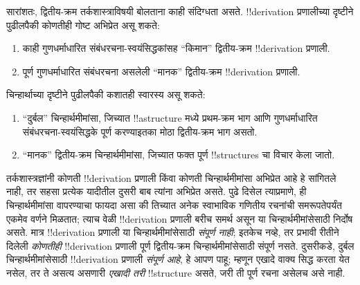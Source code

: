 \documentclass[../../../include/open-logic-section]{subfiles}
\begin{document}
सारांशतः, द्वितीय-क्रम तर्कशास्त्राविषयी बोलताना काही संदिग्धता असते.
!!{derivation} प्रणालीच्या दृष्टीने पुढीलपैकी कोणतीही गोष्ट अभिप्रेत असू शकते:
\begin{enumerate}
\item काही गुणधर्माधारित संबंधरचना-स्वयंसिद्धकांसह “किमान” द्वितीय-क्रम
  !!{derivation} प्रणाली.
\item पूर्ण गुणधर्माधारित संबंधरचना असलेली “मानक” द्वितीय-क्रम
  !!{derivation} प्रणाली.
\end{enumerate}
चिन्हार्थाच्या दृष्टीने पुढीलपैकी कशातही स्वारस्य असू शकते:
\begin{enumerate}
\item “दुर्बल” चिन्हार्थमीमांसा, जिच्यात !!a{structure} मध्ये प्रथम-क्रम
  भाग आणि गुणधर्माधारित संबंधरचना-स्वयंसिद्धके पूर्ण करण्याइतका मोठा
  द्वितीय-क्रम भाग असतो.
\item “मानक” द्वितीय-क्रम चिन्हार्थमीमांसा, जिच्यात फक्त पूर्ण
  !!{structure}s चा विचार केला जातो.
\end{enumerate}
तर्कशास्त्रज्ञांनी कोणती !!{derivation} प्रणाली किंवा कोणती चिन्हार्थमीमांसा
अभिप्रेत आहे हे सांगितले नाही, तर सहसा प्रत्येक यादीतील दुसरी बाब त्यांना
अभिप्रेत असते. पुढे दिसेल त्याप्रमाणे, ही चिन्हार्थमीमांसा वापरण्याचा फायदा असा
की तिच्यात अनेक स्वाभाविक गणितीय रचनांची समरूपतेपर्यंत एकमेव वर्णने मिळतात;
त्याच वेळी !!{derivation} प्रणाली बरीच समर्थ असून या चिन्हार्थमीमांसेसाठी
निर्दोष असते. मात्र !!{derivation} प्रणाली या चिन्हार्थमीमांसेसाठी
\emph{संपूर्ण नाही}; इतकेच नव्हे, तर प्रभावी रीतीने दिलेली \emph{कोणतीही}
!!{derivation} प्रणाली पूर्ण द्वितीय-क्रम चिन्हार्थमीमांसेसाठी संपूर्ण नसते.
दुसरीकडे, दुर्बल चिन्हार्थमीमांसेसाठी !!{derivation} प्रणाली \emph{संपूर्ण
आहे}, हे आपण पाहू; म्हणून एखादे वाक्य सिद्ध करता येत नसेल, तर ते असत्य असणारी
\emph{एखादी तरी} !!{structure} असते, जरी ती पूर्ण रचना असेलच असे नाही.
\end{document}
